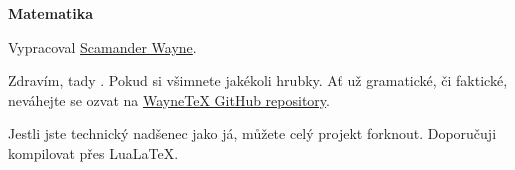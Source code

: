 \documentclass[main.tex]{subfiles}
\begin{document}
\vspace*{\fill}
\begin{center}
\begin{minipage}[c]{0.35\textwidth}
\begin{center}
{\HUGE\color{WPP}\textbf{Matematika}}\\
\vspace{0em}%
\end{center}
{\color{WPP}}%
\vspace{0em}\par
\begin{center}
{\large Vypracoval \href{https://github.com/ScamanderWayne}{\color{WPP}Scamander Wayne}}.
\end{center}
\end{minipage}
\end{center}
\vspace*{\fill}
\vspace*{\fill}
\thispagestyle{empty}
\newpage
\vspace*{\fill}    %

\hfill\begin{minipage}{0.6\textwidth}
\raggedleft               %
\parindent=0pt            %
Zdravím, tady .
Pokud si všimnete jakékoli hrubky.
Ať už gramatické, či faktické, neváhejte se ozvat na \href{https://github.com/ScamanderWayne/WayneTeX/issues/new/choose}{\color{WPP}WayneTeX GitHub repository}.

\bigskip
Jestli jste technický nadšenec jako já, můžete celý projekt forknout.
Doporučuji kompilovat přes Lua\LaTeX .
\end{minipage}
\thispagestyle{empty}
\wpage
\end{document}
